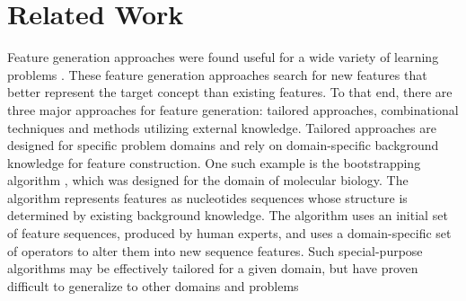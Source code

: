 \documentclass[twoside,11pt]{article}
\theoremstyle{definition}
\begin{document}





\section{Related Work}

Feature generation approaches were found useful for a wide variety of learning problems \cite{markovitch2002feature,ragavan1993complex,utgo1991linear}.
These feature generation approaches search for new features that better represent the target concept than existing features. To that end, there are three major approaches for feature generation: tailored approaches, combinational techniques and methods utilizing external knowledge.
Tailored approaches \cite{sutton1991learning,hirsh1994bootstrapping} are designed for specific problem domains and rely on domain-specific background knowledge for feature construction. One such example is the bootstrapping algorithm \cite{hirsh1994bootstrapping}, which was designed for the domain of molecular biology. The algorithm represents features as nucleotides sequences
whose structure is determined by existing background knowledge. The algorithm uses an initial set of feature sequences, produced by human experts, and uses a domain-specific set of operators to alter them into new sequence features. Such special-purpose algorithms may be effectively tailored for a given domain, but have proven difficult to generalize to other domains and problems
\end{document}
